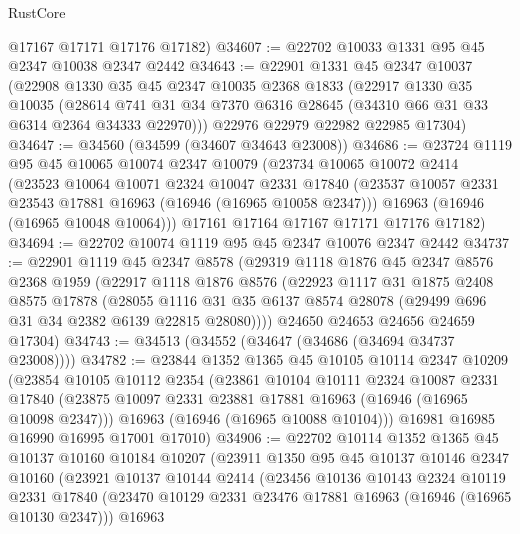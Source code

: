 \begin{lexlean}{RustCore}
\begin{coremodule}
      @17167
      @17171
      @17176
      @17182)
@34607 := @22702 @10033 @1331 @95 @45 @2347 @10038 @2347 @2442
@34643 := @22901
    @1331
    @45
    @2347
    @10037
    (@22908
      @1330
      @35
      @45
      @2347
      @10035
      @2368
      @1833
      (@22917
        @1330
        @35
        @10035
        (@28614 @741 @31 @34 @7370 @6316 @28645 (@34310 @66 @31 @33 @6314 @2364 @34333 @22970)))
      @22976
      @22979
      @22982
      @22985
      @17304)
@34647 := @34560 (@34599 (@34607 @34643 @23008))
@34686 := @23724
    @1119
    @95
    @45
    @10065
    @10074
    @2347
    @10079
    (@23734
      @10065
      @10072
      @2414
      (@23523
        @10064
        @10071
        @2324
        @10047
        @2331
        @17840
        (@23537 @10057 @2331 @23543 @17881 @16963 (@16946 (@16965 @10058 @2347)))
        @16963
        (@16946 (@16965 @10048 @10064)))
      @17161
      @17164
      @17167
      @17171
      @17176
      @17182)
@34694 := @22702 @10074 @1119 @95 @45 @2347 @10076 @2347 @2442
@34737 := @22901
    @1119
    @45
    @2347
    @8578
    (@29319
      @1118
      @1876
      @45
      @2347
      @8576
      @2368
      @1959
      (@22917
        @1118
        @1876
        @8576
        (@22923
          @1117
          @31
          @1875
          @2408
          @8575
          @17878
          (@28055
            @1116
            @31
            @35
            @6137
            @8574
            @28078
            (@29499 @696 @31 @34 @2382 @6139 @22815 @28080))))
      @24650
      @24653
      @24656
      @24659
      @17304)
@34743 := @34513 (@34552 (@34647 (@34686 (@34694 @34737 @23008))))
@34782 := @23844
    @1352
    @1365
    @45
    @10105
    @10114
    @2347
    @10209
    (@23854
      @10105
      @10112
      @2354
      (@23861
        @10104
        @10111
        @2324
        @10087
        @2331
        @17840
        (@23875 @10097 @2331 @23881 @17881 @16963 (@16946 (@16965 @10098 @2347)))
        @16963
        (@16946 (@16965 @10088 @10104)))
      @16981
      @16985
      @16990
      @16995
      @17001
      @17010)
@34906 := @22702
    @10114
    @1352
    @1365
    @45
    @10137
    @10160
    @10184
    @10207
    (@23911
      @1350
      @95
      @45
      @10137
      @10146
      @2347
      @10160
      (@23921
        @10137
        @10144
        @2414
        (@23456
          @10136
          @10143
          @2324
          @10119
          @2331
          @17840
          (@23470 @10129 @2331 @23476 @17881 @16963 (@16946 (@16965 @10130 @2347)))
          @16963

\end{coremodule}
\end{lexlean}
